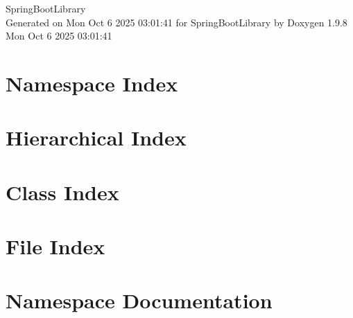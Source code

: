 \documentclass[twoside]{book}
\newcommand{\+}{\discretionary{\mbox{\scriptsize$\hookleftarrow$}}{}{}}
\newcommand{\clearemptydoublepage}{%
    \newpage{\pagestyle{empty}\cleardoublepage}%
  }
\begin{document}
  \raggedbottom
    \hypersetup{pageanchor=false,
                bookmarksnumbered=true,
                pdfencoding=unicode
               }
  \begin{titlepage}
  \vspace*{7cm}
  \begin{center}%
  {\Large Spring\+Boot\+Library}\\
  \vspace*{1cm}
  {\large Generated on Mon Oct 6 2025 03\+:01\+:41 for Spring\+Boot\+Library by Doxygen 1.9.8}\\
    \vspace*{0.5cm}
    {\small Mon Oct 6 2025 03:01:41}
  \end{center}
  \end{titlepage}
  \clearemptydoublepage
  \tableofcontents
  \clearemptydoublepage
  \hypersetup{pageanchor=true}
\chapter{Namespace Index}

\chapter{Hierarchical Index}

\chapter{Class Index}

\chapter{File Index}

\chapter{Namespace Documentation}








\end{document}

